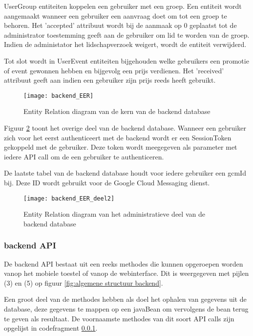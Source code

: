UserGroup entiteiten koppelen een gebruiker met een groep. Een entiteit wordt aangemaakt wanneer een gebruiker een aanvraag doet om tot een groep te behoren. Het 'accepted' attribuut wordt bij de aanmaak op 0 geplaatst tot de administrator toestemming geeft aan de gebruiker om lid te worden van de groep. Indien de administator het lidschapverzoek weigert, wordt de entiteit verwijderd.

Tot slot wordt in UserEvent entiteiten bijgehouden welke gebruikers een promotie of event gewonnen hebben en bijgevolg een prijs verdienen. Het 'received' attribuut geeft aan indien een gebruiker zijn prijs reeds heeft gebruikt.

\begin{figure}[H]
	\texttt{[image: backend\_EER]}
	\caption{Entity Relation diagram van de kern van de backend database}
	\label{fig:Backend ER}
\end{figure}

Figuur \ref{fig:Backend ER 2} toont het overige deel van de backend database. Wanneer een gebruiker zich voor het eerst authenticeert met de backend wordt er een SessionToken gekoppeld met de gebruiker. Deze token wordt meegegeven als parameter met iedere API call om de een gebruiker te authenticeren. 

De laatste tabel van de backend database houdt voor iedere gebruiker een gcmId bij. Deze ID wordt gebruikt voor de Google Cloud Messaging dienst.

\begin{figure}[H]
	\centering
	\texttt{[image: backend\_EER\_deel2]}
	\caption{Entity Relation diagram van het administratieve deel van de backend database}
	\label{fig:Backend ER 2}
\end{figure}

\subsubsection{backend API}
\label{backend API}
De backend API bestaat uit een reeks methodes die kunnen opgeroepen worden vanop het mobiele toestel of vanop de webinterface. Dit is weergegeven met pijlen (3) en (5) op figuur \ref{fig:algemene structuur backend}. 

Een groot deel van de methodes hebben als doel het ophalen van gegevens uit de database, deze gegevens te mappen op een javaBean om vervolgens de bean terug te geven als resultaat. De voornaamste methodes van dit soort API calls zijn opgelijst in codefragment \ref{backend API}.


